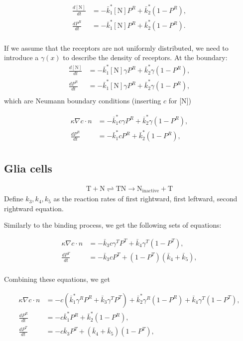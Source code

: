 \documentclass[11pt, a4paper]{article}\usepackage[]{graphicx}\usepackage[]{color}
\begin{document}
\begin{align*}
\frac{d[\text{N}]}{dt} &= -\bar{k}_1^*[\text{N}]P^R + \bar{k}_2^*(1-P^R),\\
\frac{dP^R}{dt} &= -\bar{k}_1^*[\text{N}]P^R + \bar{k}_2^*(1-P^R).\\
\end{align*}

If we assume that the receptors are not uniformly distributed, we need to introduce a $\gamma(x)$ to describe the density of receptors.
At the boundary:
\begin{align*}
\frac{d[\text{N}]}{dt} &= -\bar{k}_1^*[\text{N}]\gamma P^R + \bar{k}_2^*\gamma(1-P^R),\\
\frac{dP^R}{dt} &= -\bar{k}_1^*[\text{N}]\gamma P^R + \bar{k}_2^*\gamma(1-P^R),\\
\end{align*}
which are Neumann boundary conditions (inserting $c$ for [N])

\begin{align*}
\kappa \nabla c \cdot n &= -\bar{k}_1^*c\gamma P^R + \bar{k}_2^*\gamma(1-P^R),\\
\frac{dP^R}{dt} &= -\bar{k}_1^*c P^R + \bar{k}_2^*(1-P^R),\\
\end{align*}

\subsection*{Glia cells}


\begin{align*}
\text{T} + \text{N} \rightleftharpoons \text{TN} \rightarrow \text{N}_{\text{inactive}} + \text{T}
\end{align*}
Define $k_3, k_4, k_5$ as the reaction rates of first rightward, first leftward, second rightward equation.

Similarly to the binding process, we get the following sets of equations:

\begin{align*}
\kappa \nabla c \cdot n &= -\bar{k}_3c\gamma^T P^T + \bar{k}_4\gamma^T(1-P^T),\\
\frac{dP^T}{dt} &= -\bar{k}_3c P^T + (1-P^T)(\bar{k}_4 + \bar{k}_5),\\
\end{align*}


Combining these equations, we get

\begin{align*}
\kappa \nabla c \cdot n &= -c(\bar{k}_1^*\gamma^R P^R + \bar{k}_3\gamma^T P^T) + \bar{k}_2^*\gamma^R (1-P^R) + \bar{k}_4\gamma^T (1-P^T)    ,\\
\frac{dP^R}{dt} &= -c\bar{k}_1^* P^R + \bar{k}_2^*(1-P^R),\\
\frac{dP^T}{dt} &= -c\bar{k}_3 P^T + (\bar{k}_4 + \bar{k}_5)(1-P^T),\\
\end{align*}
\end{document}

